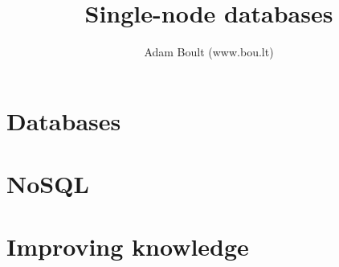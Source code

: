 \documentclass[oneside]{book}
\begin{document}
\author{Adam Boult (www.bou.lt)}
\title{Single-node databases}
\maketitle

\setcounter{tocdepth}{0}
\tableofcontents



\part{Databases}




\part{NoSQL}


\part{Improving knowledge}


\end{document}
